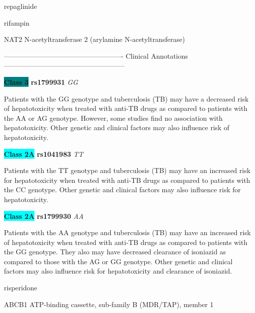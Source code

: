 \documentclass{resume} %
\begin{document}
\begin{rSection}{ repaglinide }
\end{rSection}\begin{rSection}{ rifampin }
\item[]

\begin{rSubsection}{ NAT2 }{ N-acetyltransferase 2 (arylamine N-acetyltransferase) }{}{}
\item[]

\item[] ---------------------------------------------------- Clinical Annotations -----------------------------------------------------\newline
\item \textbf{\colorbox{teal} {Class 3}} \textbf{ rs1799931 } \textit{ GG }
\item[] Patients with the GG genotype and tuberculosis (TB) may have a decreased risk of hepatotoxicity when treated with anti-TB drugs as compared to patients with the AA or AG genotype. However, some studies find no association with hepatotoxicity. Other genetic and clinical factors may also influence risk of hepatotoxicity.\item \textbf{\colorbox{cyan} {Class 2A}} \textbf{ rs1041983 } \textit{ TT }
\item[] Patients with the TT genotype and tuberculosis (TB) may have an increased risk for hepatotoxicity when treated with anti-TB drugs as compared to patients with the CC genotype. Other genetic and clinical factors may also influence risk for hepatotoxicity.\item \textbf{\colorbox{cyan} {Class 2A}} \textbf{ rs1799930 } \textit{ AA }
\item[] Patients with the AA genotype and tuberculosis (TB) may have an increased risk of hepatotoxicity when treated with anti-TB drugs as compared to patients with the GG genotype. They also may have decreased clearance of isoniazid as compared to those with the AG or GG genotype. Other genetic and clinical factors may also influence risk for hepatotoxicity and clearance of isoniazid.
\end{rSubsection}

\end{rSection}\begin{rSection}{ risperidone }
\item[]

\begin{rSubsection}{ ABCB1 }{ ATP-binding cassette, sub-family B (MDR/TAP), member 1 }{}{}
\item[]


\end{rSubsection}
\end{rSection}
\end{document}
